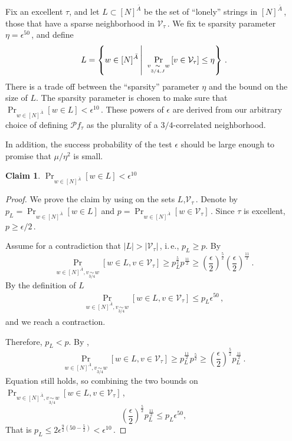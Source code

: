 \documentclass[11pt]{article}
\numberwithin{equation}{section}
\newtheorem{claim}[theorem]{Claim}
\theoremstyle{definition}
\theoremstyle{plain}
\newcommand{\ie}{i.\,e.}
\newcommand{\Prob}[2][]{\Pr_{{#1}}\left[#2\right]} %
\newcommand{\Paren}[1]{\left(#1\right)} %
\newcommand{\abs}[1]{\lvert#1\rvert} %
\newcommand\sett[2]{\left\{ #1 \left| \; \vphantom{#1 #2} \right. #2  \right\}} %
\newcommand\f{f} %
\newcommand\bh{\mathcal{P}\f_\tau} %
\newcommand\cons{\mathcal{V}} %
\newcommand\cor[1]{\underset{\scriptscriptstyle#1}{\sim}} %
\newcommand\rest[1]{{\bar{#1}}}  %
\begin{document}
Fix an excellent $\tau$, and let $L\subset [N]^{\rest{A}}$ be the set of ``lonely'' strings in $[N]^{\rest{A}}$\,, those that have a sparse neighborhood in $\cons_\tau$\,. We fix te sparsity parameter $\eta = \epsilon^{50}$\,, and define
\[ L = \sett{w\in [N]^{\rest{A}}}{\Prob[v\cor{3/4,J}w]{v\in \cons_\tau}\leq \eta}\,. \] %
There is a trade off between the ``sparsity'' parameter $\eta$ and the bound on the size of $L$. The sparsity parameter is chosen to make sure that $\Pr_{w\in[N]^{\rest{A}}}[w\in L] <  \epsilon^{10}$\,. These powers of $\epsilon$ are derived from our arbitrary choice of defining $\bh$ as the plurality of a 
%
%
%
$3/4$-correlated  %
neighborhood.

In addition, the success probability of the test $\epsilon$ should be large enough to promise that 
%
$\mu/\eta^2$ %
 is small.

\begin{claim}\label{claim:few lonely}
    $\Pr_{w\in[N]^{\rest{A}}}[w\in L]< \epsilon^{10}$
\end{claim}
\begin{proof}
    We prove the claim by using  on the sets $L$,$\cons_\tau$\,. Denote by $p_L = \Pr_{w\in[N]^{\rest{A}}}[w\in L]$ and $p = \Pr_{w\in[N]^{\rest{A}}}[w\in \cons_\tau]$\,.
    Since $\tau$ is excellent, $p\geq
    \epsilon/2$\,. %
    
Assume %
for   %
a contradiction that $\abs{L}>\abs{\cons_\tau}$\,, \ie, $p_L \geq p$. By 
    \[ \Pr_{w\in[N]^{\rest{A}},v\cor{3/4}w}[w\in L,v\in\cons_\tau]\geq p_L^{\frac{5}{2}}p^{\frac{11}{2}} \geq \Paren{\frac{\epsilon}{2}}^{\frac{5}{2}}\Paren{\frac{\epsilon}{2}}^{\frac{11}{2}}\,. \]%
    By the definition of $L$
    \begin{align}\label{eq:L bound}
        \Pr_{w\in[N]^{\rest{A}},v\cor{3/4}w}[w\in L,v\in\cons_\tau] \leq p_L \epsilon^{50}\,, %
    \end{align} 
    and we reach a contraction. 
    
    Therefore, $p_L < p$. By , 
    \[ \Pr_{w\in[N]^{\rest{A}},v\cor{3/4}w}[w\in L,v\in\cons_\tau]\geq p_L^{\frac{11}{2}}p^{\frac{5}{2}} \geq \Paren{\frac{\epsilon}{2}}^{\frac{5}{2}}p_L^{\frac{11}{2}}\,. \] %
    Equation  still holds, so combining the two bounds on $ \Pr_{w\in[N]^{\rest{A}},v\cor{3/4}w}[w\in L,v\in\cons_\tau]$\,,
    \[ \Paren{\frac{\epsilon}{2}}^{\frac{5}{2}}p_L^{\frac{11}{2}} \leq p_L \epsilon^{50}, \]
    That is $p_L\leq 2\epsilon^{\frac{9}{2}(50-\frac{5}{2})}<\epsilon^{10}$\,.
\end{proof}
\end{document}
